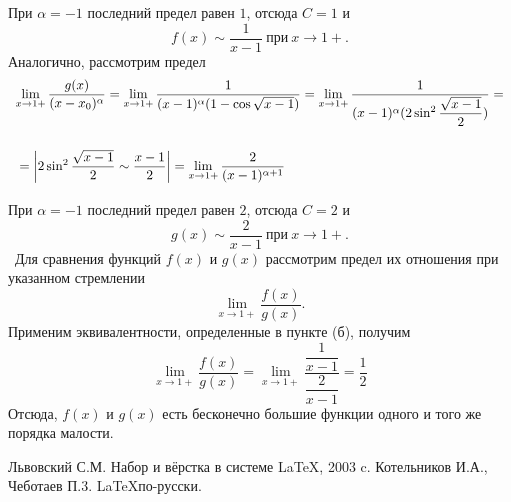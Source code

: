 \documentclass[12pt]{article}
\begin{document}
	При $\alpha=-1 $ последний предел равен $1$, отсюда $C=1$ и 
	$$
	f(x)\sim \dfrac{1}{x-1} ~\text{при}~x\rightarrow 1+.
	$$
	Аналогично, рассмотрим предел
	$$
	\begin{array}{l}
		\lim\limits_{x\rightarrow 1+}\dfrac{g(x)}{(x-x_0)^{\alpha}}=\lim\limits_{x\rightarrow 1+} \dfrac{1}{(x-1)^{\alpha}(1-\cos\sqrt{x-1})} =\lim\limits_{x\rightarrow 1+} \dfrac{1}{(x-1)^{\alpha}(2\sin^2\dfrac{\sqrt{x-1}}{2})}=\\ \medskip{}{} \\ \medskip{}{}=\left|2\sin^2\dfrac{\sqrt{x-1}}{2} \sim \dfrac{x-1}{2} \right|=\lim\limits_{x\rightarrow 1+} \dfrac{2}{(x-1)^{\alpha+1}}
	\end{array}
	$$
	При $\alpha=-1$ последний предел равен $2$, отсюда $C=2$ и
	$$
	g(x)\sim\dfrac{2}{x-1}~\text{при}~x\rightarrow 1+.
	$$
	~Для сравнения функций $f(x)$ и $g(x)$ рассмотрим предел их отношения при указанном стремлении
	$$
	\lim\limits_{x\rightarrow 1+}\dfrac{f(x)}{g(x)}.
	$$
	Применим эквивалентности, определенные в пункте (б), получим
	$$
	\lim\limits_{x\rightarrow 1+}\dfrac{f(x)}{g(x)} = \lim\limits_{x\rightarrow 1+}\dfrac{\dfrac{1}{x-1}}{\dfrac{2}{x-1}}=\dfrac{1}{2}
	$$
	Отсюда, $f(x)$ и $g(x)$ есть бесконечно большие функции одного и того же порядка малости.
	\newpage
	\begin{thebibliography}{99}
		 Львовский С.М. Набор и вёрстка в системе \LaTeX, 2003 c.
		 Котельников И.А., Чеботаев П.3. \LaTeX по-русски.
	\end{thebibliography}
\end{document}
